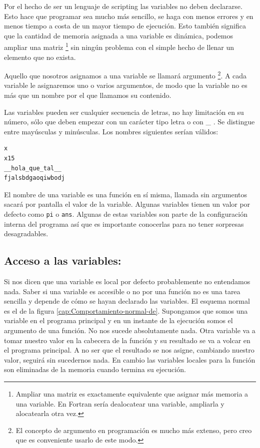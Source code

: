 Por el hecho de ser un lenguaje de scripting las variables no deben
declararse. Esto hace que programar sea mucho más sencillo, se haga
con menos errores y en menos tiempo a costa de un mayor tiempo de
ejecución. Esto también significa que la cantidad de memoria asignada
a una variable es dinámica, podemos ampliar una matriz %
\footnote{Ampliar una matriz es exactamente equivalente que asignar
  más memoria a una variable. En Fortran sería dealocatear una
  variable, ampliarla y alocatearla otra vez.%
} sin ningún problema con el simple hecho de llenar un elemento que no
exista.

Aquello que nosotros asignamos a una variable se llamará argumento%
\footnote{El concepto de argumento en programación es mucho más extenso, pero
creo que es conveniente usarlo de este modo.%
}. A cada variable le asignaremos uno o varios argumentos, de modo
que la variable no es más que un nombre por el que llamamos su contenido.

Las variables pueden ser cualquier secuencia de letras, no hay
limitación en su número, sólo que deben empezar con un carácter tipo
letra o con \_ . Se distingue entre mayúsculas y minúsculas. Los
nombres siguientes serían válidos:

\begin{verbatim}
x
x15
__hola_que_tal__
fjalsbdgaoqiwbodj
\end{verbatim}
El nombre de una variable es una función en sí misma, llamada sin
argumentos sacará por pantalla el valor de la variable. Algunas
variables tienen un valor por defecto como \texttt{pi} o \texttt{ans}.
Algunas de estas variables son parte de la configuración interna del
programa así que es importante conocerlas para no tener sorpresas
desagradables.


\subsection{Acceso a las variables:}

Si nos dicen que una variable es local por defecto probablemente no
entendamos nada. Saber si una variable es accesible o no por una
función no es una tarea sencilla y depende de cómo se hayan declarado
las variables. El esquema normal es el de la figura
\ref{cap:Comportamiento-normal-de}.  Supongamos que somos una variable
en el programa principal y en un instante de la ejecución somos el
argumento de una función. No nos sucede absolutamente nada. Otra
variable va a tomar nuestro valor en la cabecera de la función y su
resultado se va a volcar en el programa principal. A no ser que el
resultado se nos asigne, cambiando nuestro valor, seguirá sin
sucedernos nada. En cambio las variables locales para la función son
eliminadas de la memoria cuando termina su ejecución.

